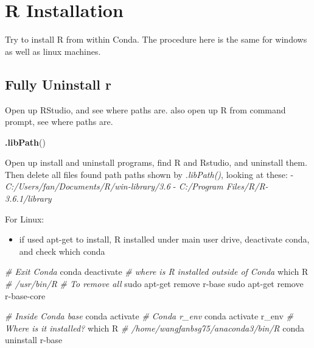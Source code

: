 \documentclass[]{article}
\newenvironment{Shaded}{\begin{snugshade}}{\end{snugshade}}
\newcommand{\CommentTok}[1]{\textcolor[rgb]{0.56,0.35,0.01}{\textit{#1}}}
\newcommand{\ExtensionTok}[1]{#1}
\newcommand{\FunctionTok}[1]{\textcolor[rgb]{0.00,0.00,0.00}{#1}}
\newcommand{\KeywordTok}[1]{\textcolor[rgb]{0.13,0.29,0.53}{\textbf{#1}}}
\newcommand{\NormalTok}[1]{#1}
\providecommand{\tightlist}{%
  \setlength{\itemsep}{0pt}\setlength{\parskip}{0pt}}
\begin{document}
\hypertarget{r-installation}{%
\section{R Installation}\label{r-installation}}

Try to install R from within Conda. The procedure here is the same for
windows as well as linux machines.

\hypertarget{fully-uninstall-r}{%
\subsection{Fully Uninstall r}\label{fully-uninstall-r}}

Open up RStudio, and see where paths are. also open up R from command
prompt, see where paths are.

\begin{Shaded}
\begin{Highlighting}[]
\KeywordTok{.libPath}\NormalTok{()}
\end{Highlighting}
\end{Shaded}

Open up install and uninstall programs, find R and Rstudio, and
uninstall them. Then delete all files found path paths shown by
\emph{.libPath()}, looking at these: -
\emph{C:/Users/fan/Documents/R/win-library/3.6} - \emph{C:/Program
Files/R/R-3.6.1/library}

For Linux:

\begin{itemize}
\tightlist
\item
  if used apt-get to install, R installed under main user drive,
  deactivate conda, and check which conda
\end{itemize}

\begin{Shaded}
\begin{Highlighting}[]
\CommentTok{# Exit Conda}
\ExtensionTok{conda}\NormalTok{ deactivate}
\CommentTok{# where is R installed outside of Conda}
\FunctionTok{which}\NormalTok{ R}
\CommentTok{# /usr/bin/R}
\CommentTok{# To remove all}
\FunctionTok{sudo}\NormalTok{ apt-get remove r-base}
\FunctionTok{sudo}\NormalTok{ apt-get remove r-base-core}

\CommentTok{# Inside Conda base}
\ExtensionTok{conda}\NormalTok{ activate}
\CommentTok{# Conda r_env}
\ExtensionTok{conda}\NormalTok{ activate r_env}
\CommentTok{# Where is it installed?}
\FunctionTok{which}\NormalTok{ R}
\CommentTok{# /home/wangfanbsg75/anaconda3/bin/R}
\ExtensionTok{conda}\NormalTok{ uninstall r-base}
\end{Highlighting}
\end{Shaded}
\end{document}
